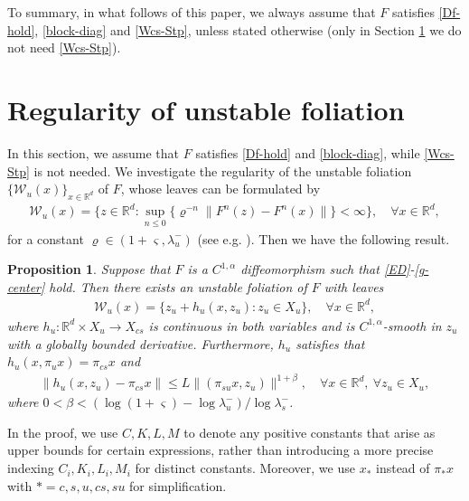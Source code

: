 \documentclass[reqno]{amsart}
\numberwithin{equation}{section}
\newtheorem{proposition}[theorem]{Proposition}
\begin{document}
To summary, in what follows of this paper, we always assume that $F$ satisfies \eqref{Df-hold}, \eqref{block-diag} and \eqref{Wcs-Stp}, unless stated otherwise (only in Section \ref{Sec-4} we do not need \eqref{Wcs-Stp}).




\section{Regularity of unstable foliation}\label{Sec-4}

In this section, we assume that $F$ satisfies \eqref{Df-hold} and \eqref{block-diag}, while \eqref{Wcs-Stp} is not needed. We investigate  the regularity of the unstable foliation $\{\mathcal{W}_u(x)\}_{x\in \mathbb{R}^d}$ of $F$,
whose leaves can be formulated by
\begin{align}\label{SF-1}
\mathcal{W}_u(x)=\Big\{z\in\mathbb{R}^d: \sup_{n\le 0}\{ \varrho^{-n}\| F^n(z)-F^n(x)\|\}<\infty\Big\},\quad \forall x\in\mathbb{R}^d,
\end{align}
for a constant $\varrho\in (1+\varsigma, \lambda_u^-)$ (see e.g.
 \cite{CHT-JDE}).
Then we have the following result.



\begin{proposition}\label{Fol-thm}
Suppose that $F$ is a $C^{1,\alpha}$ diffeomorphism
 such that \eqref{ED}-\eqref{g-center} hold.
Then there exists an unstable foliation of $F$ with leaves
\begin{align}\label{unst-foli}
\mathcal{W}_u(x)=\{z_u+h_u(x,z_u): z_u\in X_u \},\quad \forall x\in\mathbb{R}^d,
\end{align}
where $h_u: \mathbb{R}^d \times X_u \to X_{cs}$ is continuous in both variables and is $C^{1,\alpha}$-smooth in $z_u$ with a globally bounded derivative.
Furthermore, $h_u$ satisfies that $h_u(x,\pi_u x)=\pi_{cs} x$ and
\begin{align}\label{hh-u}
\|h_u(x,z_u)-\pi_{cs}x\|
\le L\|(\pi_{su} x,z_u)\|^{1+\beta},\quad \forall x\in \mathbb{R}^d,~\forall z_u\in X_u,
\end{align}
where $0< \beta<(\log(1+\varsigma)-\log\lambda_u^-)/\log\lambda_s^-$.
\end{proposition}

In the proof, we use $C,K,L,M$ to denote any positive constants that arise as upper bounds for certain expressions, rather than introducing a more precise indexing $C_i,K_i,L_i,M_i$ for distinct constants.
Moreover, we use $x_*$ instead of $\pi_* x$ with $*=c,s,u,cs,su$ for simplification.
\end{document}
